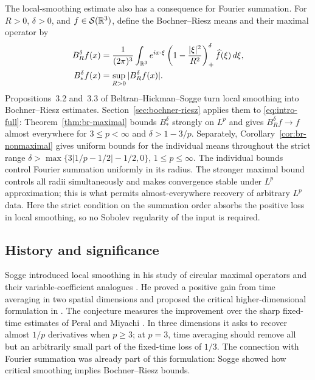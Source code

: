 The local-smoothing estimate also has a consequence for Fourier summation.
For $R>0$, $\delta>0$, and $f\in\mathcal S(\mathbb R^3)$, define the
Bochner--Riesz means and their maximal operator by
\begin{equation}\label{eq:intro-br-means}
 \begin{split}
 B_R^\delta f(x)
 &=\frac1{(2\pi)^3}\int_{\mathbb R^3}e^{ix\cdot\xi}
       \left(1-\frac{|\xi|^2}{R^2}\right)_+^\delta
       \widehat f(\xi)\,d\xi,\\
 B_*^\delta f(x)&=\sup_{R>0}|B_R^\delta f(x)|.
 \end{split}
\end{equation}
Propositions~3.2 and~3.3 of Beltran--Hickman--Sogge
\cite{BeltranHickmanSogge2019Survey} turn local smoothing into
Bochner--Riesz estimates. Section~\ref{sec:bochner-riesz} applies them to
\eqref{eq:intro-full}: Theorem~\ref{thm:br-maximal} bounds $B_*^\delta$
strongly on $L^p$ and gives $B_R^\delta f\to f$ almost everywhere for
$3\le p<\infty$ and $\delta>1-3/p$. Separately,
Corollary~\ref{cor:br-nonmaximal} gives uniform bounds for the individual
means throughout the strict range
$\delta>\max\{3|1/p-1/2|-1/2,0\}$, $1\le p\le\infty$.
The individual bounds control Fourier summation uniformly in its
radius. The stronger maximal bound controls all radii simultaneously
and makes convergence stable under $L^p$ approximation; this is what
permits almost-everywhere recovery of arbitrary $L^p$ data. Here the
strict condition on the summation order absorbs the positive loss in
local smoothing, so no Sobolev regularity of the input is required.

\subsection{History and significance}

Sogge introduced local smoothing in his study of circular maximal
operators and their variable-coefficient analogues \cite{Sogge1991}.
He proved a positive gain from time averaging in two spatial dimensions
and proposed the critical higher-dimensional formulation in
\cite[Section~4, especially (4.5)]{Sogge1991}. The conjecture measures
the improvement over the sharp fixed-time estimates of Peral and
Miyachi \cite{Peral1980,Miyachi1980}. In three dimensions it asks to
recover almost $1/p$ derivatives when $p\ge3$; at $p=3$, time
averaging should remove all but an arbitrarily small part of the
fixed-time loss of $1/3$. The connection with Fourier summation was
already part of this formulation: Sogge showed how critical smoothing
implies Bochner--Riesz bounds.

